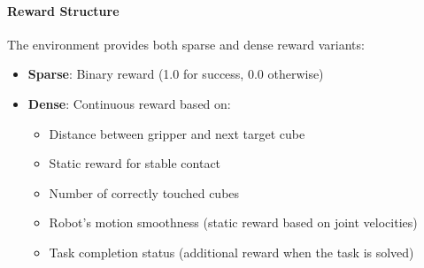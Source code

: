 \paragraph{Reward Structure} The environment provides both sparse and dense reward variants:
\begin{itemize}
    \item \textbf{Sparse}: Binary reward (1.0 for success, 0.0 otherwise)
    \item \textbf{Dense}: Continuous reward based on:
    \begin{itemize}
        \item Distance between gripper and next target cube
        \item Static reward for stable contact
        \item Number of correctly touched cubes
        \item Robot's motion smoothness (static reward based on joint velocities)
        \item Task completion status (additional reward when the task is solved)
    \end{itemize}
\end{itemize}